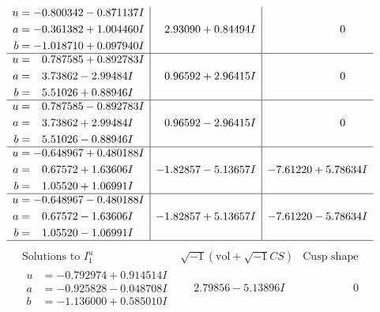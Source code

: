 \documentclass[1p]{elsarticle_modified}
\theoremstyle{definition}
\newcommand{\I}{\sqrt{-1}}
\begin{document}
$$\begin{array}{c|c|c}
\begin{aligned}
u &= -0.800342 - 0.871137 I \\
a &= -0.361382 + 1.004460 I \\
b &= -1.018710 + 0.097940 I\end{aligned}
 & \phantom{-}2.93090 + 0.84494 I & \phantom{-0.000000 } 0 \\ \hline\begin{aligned}
u &= \phantom{-}0.787585 + 0.892783 I \\
a &= \phantom{-}3.73862 - 2.99484 I \\
b &= \phantom{-}5.51026 + 0.88946 I\end{aligned}
 & \phantom{-}0.96592 + 2.96415 I & \phantom{-0.000000 } 0 \\ \hline\begin{aligned}
u &= \phantom{-}0.787585 - 0.892783 I \\
a &= \phantom{-}3.73862 + 2.99484 I \\
b &= \phantom{-}5.51026 - 0.88946 I\end{aligned}
 & \phantom{-}0.96592 - 2.96415 I & \phantom{-0.000000 } 0 \\ \hline\begin{aligned}
u &= -0.648967 + 0.480188 I \\
a &= \phantom{-}0.67572 + 1.63606 I \\
b &= \phantom{-}1.05520 + 1.06991 I\end{aligned}
 & -1.82857 - 5.13657 I & -7.61220 + 5.78634 I \\ \hline\begin{aligned}
u &= -0.648967 - 0.480188 I \\
a &= \phantom{-}0.67572 - 1.63606 I \\
b &= \phantom{-}1.05520 - 1.06991 I\end{aligned}
 & -1.82857 + 5.13657 I & -7.61220 - 5.78634 I\\
 \hline 
 \end{array}$$\newpage$$\begin{array}{c|c|c}  
\text{Solutions to }I^u_{1}& \I (\text{vol} + \sqrt{-1}CS) & \text{Cusp shape}\\
 \hline 
\begin{aligned}
u &= -0.792974 + 0.914514 I \\
a &= -0.925828 - 0.048708 I \\
b &= -1.136000 + 0.585010 I\end{aligned}
 & \phantom{-}2.79856 - 5.13896 I & \phantom{-0.000000 } 0 \\ \hline\begin{aligned}

\end{aligned}
\end{array}$$
\end{document}

